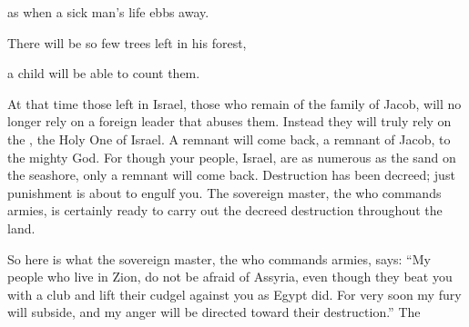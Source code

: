 {\par }{\Q as when a sick man’s life
ebbs
away.
\par }{\Q {}There will be so few
trees
left
in his forest,
\par }{\Q a child
will be
able to count them.
\par }{\PP {}At that time
those left
in Israel,
those who remain
of the family
of Jacob,
will no
longer
rely
on
a foreign leader that abuses them.
Instead they will truly
rely
on
the {}, the Holy
One of Israel.
A remnant
will come back,
a remnant
of Jacob,
to
the mighty
God.
For
though
your people,
Israel,
are as numerous as the sand
on the seashore,
only a remnant
will come back.
Destruction
has been decreed;
just punishment is about to engulf you.
The sovereign
master, the
{}
who commands armies,
is certainly ready to carry
out the decreed
destruction
throughout
the land.
\par }{\PP {}So
here is what
the sovereign
master, the
{}
who commands armies,
says: “My people
who live
in Zion,
do not
be afraid
of Assyria,
even though they beat
you with a club
and lift
their cudgel
against
you as Egypt did.
For
very
soon
my fury
will subside,
and my anger
will be directed toward their destruction.”
The

}
